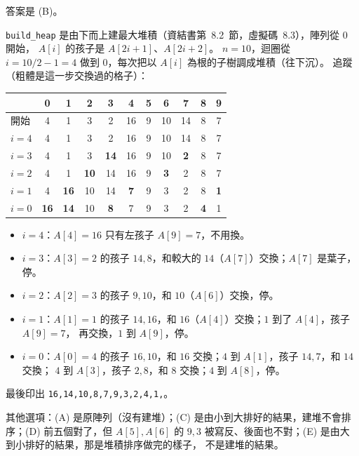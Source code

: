 \begin{pastsoln}
答案是 (B)。

\texttt{build\_heap} 是由下而上建最大堆積（資結書第~8.2~節，虛擬碼~8.3），陣列從 $0$ 開始，
$A[i]$ 的孩子是 $A[2i+1]$、$A[2i+2]$。 $n = 10$，迴圈從 $i = 10/2 - 1 = 4$ 做到 $0$，每次把以
$A[i]$ 為根的子樹調成堆積（往下沉）。 追蹤（粗體是這一步交換過的格子）：
\begin{center}
\small
\begin{tabular}{l*{10}{c}}
\toprule
 & 0 & 1 & 2 & 3 & 4 & 5 & 6 & 7 & 8 & 9 \\
\midrule
開始 & 4 & 1 & 3 & 2 & 16 & 9 & 10 & 14 & 8 & 7 \\
$i = 4$ & 4 & 1 & 3 & 2 & 16 & 9 & 10 & 14 & 8 & 7 \\
$i = 3$ & 4 & 1 & 3 & \textbf{14} & 16 & 9 & 10 & \textbf{2} & 8 & 7 \\
$i = 2$ & 4 & 1 & \textbf{10} & 14 & 16 & 9 & \textbf{3} & 2 & 8 & 7 \\
$i = 1$ & 4 & \textbf{16} & 10 & 14 & \textbf{7} & 9 & 3 & 2 & 8 & \textbf{1} \\
$i = 0$ & \textbf{16} & \textbf{14} & 10 & \textbf{8} & 7 & 9 & 3 & 2 & \textbf{4} & 1 \\
\bottomrule
\end{tabular}
\end{center}
\begin{itemize}
\item $i = 4$：$A[4] = 16$ 只有左孩子 $A[9] = 7$，不用換。
\item $i = 3$：$A[3] = 2$ 的孩子 $14, 8$，和較大的 $14$（$A[7]$）交換；$A[7]$ 是葉子，停。
\item $i = 2$：$A[2] = 3$ 的孩子 $9, 10$，和 $10$（$A[6]$）交換，停。
\item $i = 1$：$A[1] = 1$ 的孩子 $14, 16$，和 $16$（$A[4]$）交換；$1$ 到了 $A[4]$，孩子 $A[9] = 7$，
再交換，$1$ 到 $A[9]$，停。
\item $i = 0$：$A[0] = 4$ 的孩子 $16, 10$，和 $16$ 交換；$4$ 到 $A[1]$，孩子 $14, 7$，和 $14$ 交換；
$4$ 到 $A[3]$，孩子 $2, 8$，和 $8$ 交換；$4$ 到 $A[8]$，停。
\end{itemize}
最後印出 \texttt{16,14,10,8,7,9,3,2,4,1,}。

其他選項：(A) 是原陣列（沒有建堆）；(C) 是由小到大排好的結果，建堆不會排序；(D) 前五個對了，但
$A[5], A[6]$ 的 $9, 3$ 被寫反、後面也不對；(E) 是由大到小排好的結果，那是堆積排序做完的樣子，
不是建堆的結果。
\end{pastsoln}
